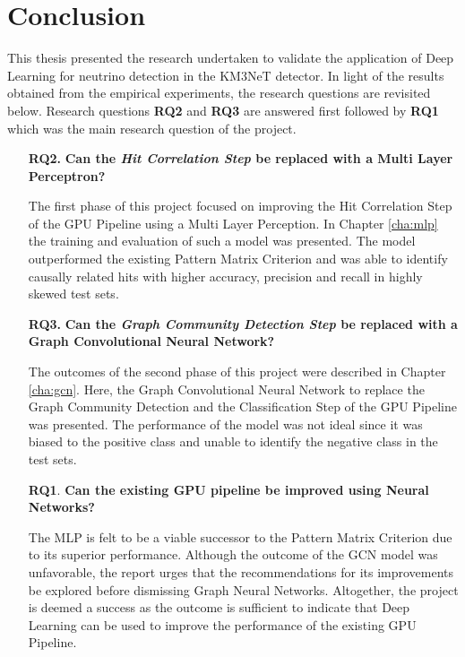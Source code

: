 
\chapter{Conclusion} %

% 

This thesis presented the research undertaken to validate the
application of Deep Learning for neutrino detection in the KM3NeT
detector. In light of the results obtained from the empirical
experiments, the research questions are revisited below. Research
questions \textbf{RQ2} and \textbf{RQ3} are answered first followed by
\textbf{RQ1} which was the main research question of the project.

\begin{enumerate}
\item[\textbf{RQ2.}] \textbf{Can the \emph{Hit Correlation Step} be replaced with a Multi Layer Perceptron?}

  The first phase of this project focused on improving the Hit
  Correlation Step of the GPU Pipeline using a Multi Layer Perception.
  In Chapter \ref{cha:mlp} the training and evaluation of such a model
  was presented. The model outperformed the existing Pattern Matrix
  Criterion and was able to identify causally related hits with higher
  accuracy, precision and recall in highly skewed test sets.

\item[\textbf{RQ3.}] \textbf{Can the \emph{Graph Community Detection Step} be replaced with a Graph Convolutional Neural Network?}

  The outcomes of the second phase of this project were described in
  Chapter \ref{cha:gcn}. Here, the Graph Convolutional Neural Network
  to replace the Graph Community Detection and the Classification Step
  of the GPU Pipeline was presented. The performance of the model was
  not ideal since it was biased to the positive class and unable to
  identify the negative class in the test sets.

\item[\textbf{RQ1}.] \textbf{Can the existing GPU pipeline be improved using Neural Networks?}

  The MLP is felt to be a viable successor to the Pattern Matrix
  Criterion due to its superior performance. Although the outcome of
  the GCN model was unfavorable, the report urges that the
  recommendations for its improvements be explored before dismissing
  Graph Neural Networks. Altogether, the project is deemed a success
  as the outcome is sufficient to indicate that Deep Learning can be
  used to improve the performance of the existing GPU Pipeline.
\end{enumerate}


